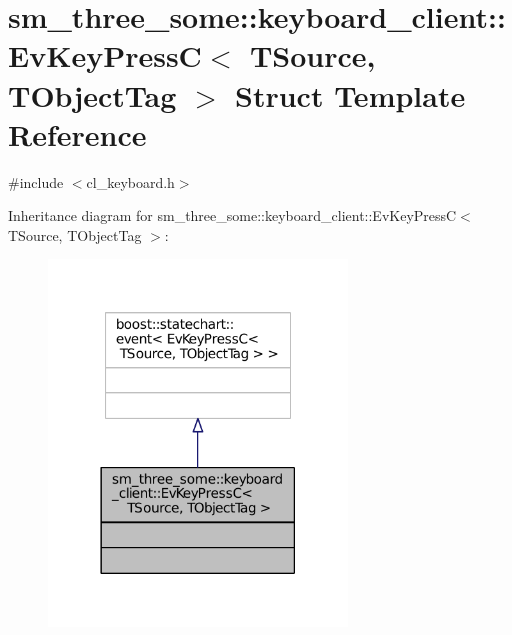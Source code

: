 \hypertarget{structsm__three__some_1_1keyboard__client_1_1EvKeyPressC}{}\section{sm\+\_\+three\+\_\+some\+:\+:keyboard\+\_\+client\+:\+:Ev\+Key\+PressC$<$ T\+Source, T\+Object\+Tag $>$ Struct Template Reference}
\label{structsm__three__some_1_1keyboard__client_1_1EvKeyPressC}


{\ttfamily \#include $<$cl\+\_\+keyboard.\+h$>$}



Inheritance diagram for sm\+\_\+three\+\_\+some\+:\+:keyboard\+\_\+client\+:\+:Ev\+Key\+PressC$<$ T\+Source, T\+Object\+Tag $>$\+:
\nopagebreak
\begin{figure}[H]
\begin{center}
\leavevmode
\includegraphics[width=225pt]{structsm__three__some_1_1keyboard__client_1_1EvKeyPressC__inherit__graph}
\end{center}
\end{figure}


